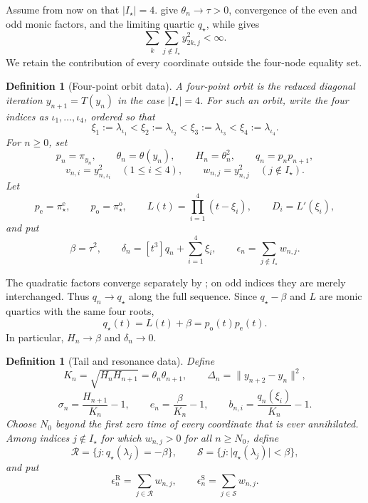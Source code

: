 \documentclass[11pt]{article}
\newtheorem{definition}[lemma]{Definition}
\begin{document}
Assume from now on that \(\lvert I_\star\rvert=4\).
 give
\(\theta_n\to\tau>0\), convergence of the even and odd monic factors, and
the limiting quartic \(q_\star\), while
 gives
\[
 \sum_k\sum_{j\notin I_\star}y_{2k,j}^2<\infty.
\]
We retain the contribution of every coordinate outside the four-node
equality set.

\begin{definition}[Four-point orbit data]
\label{def:four-point-setting}
A \emph{four-point orbit} is the reduced diagonal iteration
\(y_{n+1}=T(y_n)\) in the case \(\lvert I_\star\rvert=4\).
For such an orbit, write the four indices as
\(\iota_1,\ldots,\iota_4\), ordered so that
\[
 \xi_1:=\lambda_{\iota_1}<\xi_2:=\lambda_{\iota_2}
 <\xi_3:=\lambda_{\iota_3}<\xi_4:=\lambda_{\iota_4}.
\]
For \(n\geq0\), set
\[
 p_n=\pi_{y_n},\qquad \theta_n=\theta(y_n),\qquad
 H_n=\theta_n^2,\qquad q_n=p_np_{n+1},
\]
\[
 v_{n,i}=y_{n,\iota_i}^2\quad(1\leq i\leq4),\qquad
 w_{n,j}=y_{n,j}^2\quad(j\notin I_\star).
\]
Let
\[
 p_{\mathrm e}=\pi_\star^{\mathrm e},\qquad
 p_{\mathrm o}=\pi_\star^{\mathrm o},\qquad
 L(t)=\prod_{i=1}^4(t-\xi_i),\qquad D_i=L'(\xi_i),
\]
and put
\[
 \beta=\tau^2,\qquad
 \delta_n=[t^3]q_n+\sum_{i=1}^4\xi_i,\qquad
 \epsilon_n=\sum_{j\notin I_\star}w_{n,j}.
\]
\end{definition}

The quadratic factors converge separately by
; on odd indices they are merely interchanged.
Thus \(q_n\to q_\star\) along the full sequence.  Since
\(q_\star-\beta\) and \(L\) are monic quartics with the same four roots,
\[
 q_\star(t)=L(t)+\beta=p_{\mathrm o}(t)p_{\mathrm e}(t).
\tag{15}\label{eq:four-point-limit-quartic}
\]
In particular, \(H_n\to\beta\) and \(\delta_n\to0\).

\begin{definition}[Tail and resonance data]
\label{def:four-point-tail-data}
Define
\[
 K_n=\sqrt{H_nH_{n+1}}=\theta_n\theta_{n+1},\qquad
 \Delta_n=\lVert y_{n+2}-y_n\rVert^2,
\]
\[
 \sigma_n=\frac{H_{n+1}}{K_n}-1,\qquad
 e_n=\frac{\beta}{K_n}-1,\qquad
 b_{n,i}=\frac{q_n(\xi_i)}{K_n}-1.
\]
Choose \(N_0\) beyond the first zero time of every coordinate that is ever
annihilated.  Among indices \(j\notin I_\star\) for which \(w_{n,j}>0\)
for all \(n\geq N_0\), define
\[
 \mathcal R=\{j:q_\star(\lambda_j)=-\beta\},\qquad
 \mathcal S=\{j:\lvert q_\star(\lambda_j)\rvert<\beta\},
\]
and put
\[
 \epsilon_n^{\mathrm R}=\sum_{j\in\mathcal R}w_{n,j},\qquad
 \epsilon_n^{\mathrm S}=\sum_{j\in\mathcal S}w_{n,j}.
\]
\end{definition}
\end{document}
